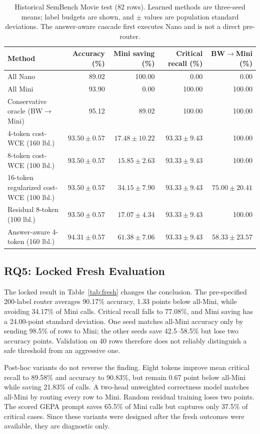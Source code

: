 \begin{table}[t]
  \centering
  \small
  \caption{Historical SemBench Movie test (82 rows). Learned methods are
  three-seed means; label budgets are shown, and $\pm$ values are population standard deviations. The
  answer-aware cascade first executes Nano and is not a direct pre-router.}
  \label{tab:historical-main}
  \begin{tabular}{lrrrr}
    \toprule
    Method & Accuracy (\%) & Mini saving (\%) & Critical recall (\%) & BW$\rightarrow$Mini (\%)\\
    \midrule
    All Nano & 89.02 & 100.00 & 0.00 & 0.00\\
    All Mini & 93.90 & 0.00 & 100.00 & 100.00\\
    Conservative oracle (BW$\rightarrow$Mini) & 95.12 & 89.02 & 100.00 & 100.00\\
    \midrule
    4-token cost-WCE (160 lbl.) & $93.50\pm0.57$ & $17.48\pm10.22$ & $93.33\pm9.43$ & 100.00\\
    8-token cost-WCE (100 lbl.) & $93.50\pm0.57$ & $15.85\pm2.63$ & $93.33\pm9.43$ & 100.00\\
    16-token regularized cost-WCE (100 lbl.) & $93.50\pm0.57$ & $34.15\pm7.90$ & $93.33\pm9.43$ & $75.00\pm20.41$\\
    Residual 8-token (100 lbl.) & $93.50\pm0.57$ & $17.07\pm4.34$ & $93.33\pm9.43$ & 100.00\\
    Answer-aware 4-token (160 lbl.) & $94.31\pm0.57$ & $61.38\pm7.06$ & $93.33\pm9.43$ & $58.33\pm23.57$\\
    \bottomrule
  \end{tabular}
\end{table}

\subsection{RQ5: Locked Fresh Evaluation}

The locked result in Table~\ref{tab:fresh} changes the conclusion. The
pre-specified 200-label router averages 90.17\% accuracy, 1.33 points below
all-Mini, while avoiding 34.17\% of Mini calls. Critical recall falls to
77.08\%, and Mini saving has a 24.00-point standard deviation. One seed matches
all-Mini accuracy only by sending 98.5\% of rows to Mini; the other seeds save
42.5--58.5\% but lose two accuracy points. Validation on 40 rows therefore does
not reliably distinguish a safe threshold from an aggressive one.

Post-hoc variants do not reverse the finding. Eight tokens improve mean
critical recall to 89.58\% and accuracy to 90.83\%, but remain 0.67 point below
all-Mini while saving 21.83\% of calls. A two-head unweighted correctness model
matches all-Mini by routing every row to Mini. Random residual training loses
two points. The scored GEPA prompt saves 65.5\% of Mini calls but captures only
37.5\% of critical cases. Since these variants were designed after the fresh
outcomes were available, they are diagnostic only.

